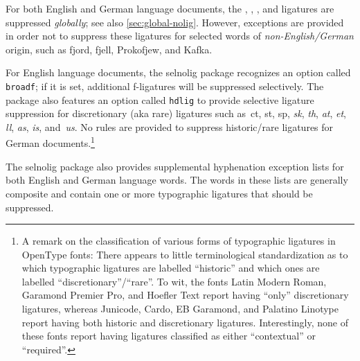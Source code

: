 \documentclass[11pt]{article}
\newcommand{\pkg}[1]{\textsf{#1}}
\newcommand{\opt}[1]{\texttt{#1}}
\begin{document}
For both English and German language documents, the {\ebg {}, , , and } ligatures are suppressed \emph{globally}; see also \cref{sec:global-nolig}. However, exceptions are provided in order not to suppress these ligatures for selected words of \emph{non-English\slash German} origin, such as {\ebg fjord, fjell, Prokofjew, and Kafka}.

For English language documents, the \pkg{selnolig} package recognizes an option called \opt{broadf}; if it is set, additional f-ligatures will be suppressed selectively. The package also features an option called \opt{hdlig} to provide selective ligature suppression for discretionary (aka rare) ligatures such as~ct, st, sp, {\ebg\emph{sk}}, \emph{th}, \emph{at}, \emph{et}, \emph{ll}, \emph{as}, \emph{is}, and~\emph{us}. No rules are provided to suppress historic\slash rare ligatures for German documents.\footnote{A remark on the classification of various forms of typographic ligatures in OpenType fonts: There appears to little terminological standardization as to which typographic ligatures are labelled \enquote{historic} and which ones are labelled \enquote{discretionary}\slash\enquote{rare}. To wit, the fonts Latin Modern Roman, Garamond Premier Pro, and Hoefler Text report having \enquote{only} discretionary ligatures, whereas Junicode, Cardo, EB Garamond, and Palatino Linotype report having both historic and discretionary ligatures. Interestingly, none of these fonts report having ligatures classified as either \enquote{contextual} or \enquote{required}. }

The \pkg{selnolig} package also provides supplemental hyphenation exception lists for both English and German language words. The words in these lists are generally composite and contain one or more typographic ligatures that should be suppressed.
\end{document}
